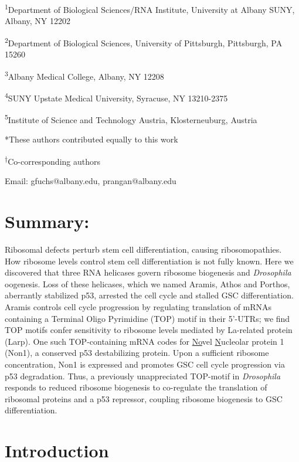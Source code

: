 \documentclass[12pt,oneside]{reedthesis}
\begin{document}
\textsuperscript{1}Department of Biological Sciences/RNA Institute, University at Albany SUNY, Albany, NY 12202

\textsuperscript{2}Department of Biological Sciences, University of Pittsburgh, Pittsburgh, PA 15260

\textsuperscript{3}Albany Medical College, Albany, NY 12208

\textsuperscript{4}SUNY Upstate Medical University, Syracuse, NY 13210-2375

\textsuperscript{5}Institute of Science and Technology Austria, Klosterneuburg, Austria

*These authors contributed equally to this work

\textsuperscript{†}Co-corresponding authors

Email: gfuchs@albany.edu, prangan@albany.edu

\hypertarget{summary-1}{%
\section{Summary:}\label{summary-1}}

Ribosomal defects perturb stem cell differentiation, causing ribosomopathies. How ribosome levels control stem cell differentiation is not fully known. Here we discovered that three RNA helicases govern ribosome biogenesis and \emph{Drosophila} oogenesis. Loss of these helicases, which we named Aramis, Athos and Porthos, aberrantly stabilized p53, arrested the cell cycle and stalled GSC differentiation. Aramis controls cell cycle progression by regulating translation of mRNAs containing a Terminal Oligo Pyrimidine (TOP) motif in their 5'-UTRs; we find TOP motifs confer sensitivity to ribosome levels mediated by La-related protein (Larp). One such TOP-containing mRNA codes for \underline{No}vel \underline{N}ucleolar protein 1 (Non1), a conserved p53 destabilizing protein. Upon a sufficient ribosome concentration, Non1 is expressed and promotes GSC cell cycle progression via p53 degradation. Thus, a previously unappreciated TOP-motif in \emph{Drosophila} responds to reduced ribosome biogenesis to co-regulate the translation of ribosomal proteins and a p53 repressor, coupling ribosome biogenesis to GSC differentiation.

\hypertarget{introduction-2}{%
\section{Introduction}\label{introduction-2}}
\end{document}
